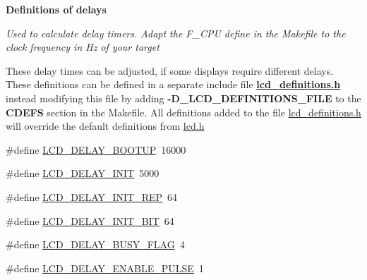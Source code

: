 \begin{Indent}{\bf Definitions of delays}\par
{\em Used to calculate delay timers. Adapt the F\+\_\+\+C\+PU define in the Makefile to the clock frequency in Hz of your target

These delay times can be adjusted, if some displays require different delays.~\newline
These definitions can be defined in a separate include file {\bfseries \hyperlink{a00003}{lcd\+\_\+definitions.\+h}} instead modifying this file by adding {\bfseries -\/\+D\+\_\+\+L\+C\+D\+\_\+\+D\+E\+F\+I\+N\+I\+T\+I\+O\+N\+S\+\_\+\+F\+I\+LE} to the {\bfseries C\+D\+E\+FS} section in the Makefile. All definitions added to the file \hyperlink{a00003}{lcd\+\_\+definitions.\+h} will override the default definitions from \hyperlink{a00002}{lcd.\+h} }\begin{DoxyCompactItemize}
\item 
\#define \hyperlink{a00006_ga79ca3fe83448ab158a4c566bf292c260}{L\+C\+D\+\_\+\+D\+E\+L\+A\+Y\+\_\+\+B\+O\+O\+T\+UP}~16000
\item 
\#define \hyperlink{a00006_gab6ba3c8cdcf1a96b0d4c476eff8f8617}{L\+C\+D\+\_\+\+D\+E\+L\+A\+Y\+\_\+\+I\+N\+IT}~5000
\item 
\#define \hyperlink{a00006_ga2ce1ac9b146b7baa7169e27f9cf3a99e}{L\+C\+D\+\_\+\+D\+E\+L\+A\+Y\+\_\+\+I\+N\+I\+T\+\_\+\+R\+EP}~64
\item 
\#define \hyperlink{a00006_gadf773dcbd0827cd15c788065c9197459}{L\+C\+D\+\_\+\+D\+E\+L\+A\+Y\+\_\+\+I\+N\+I\+T\+\_\+B\+IT}~64
\item 
\#define \hyperlink{a00006_ga73b2370827e2d350cedd45e08a9eb0b2}{L\+C\+D\+\_\+\+D\+E\+L\+A\+Y\+\_\+\+B\+U\+S\+Y\+\_\+\+F\+L\+AG}~4
\item 
\#define \hyperlink{a00006_ga5b0632f09757ffe6f018c6ef88cc3296}{L\+C\+D\+\_\+\+D\+E\+L\+A\+Y\+\_\+\+E\+N\+A\+B\+L\+E\+\_\+\+P\+U\+L\+SE}~1
\end{DoxyCompactItemize}
\end{Indent}
